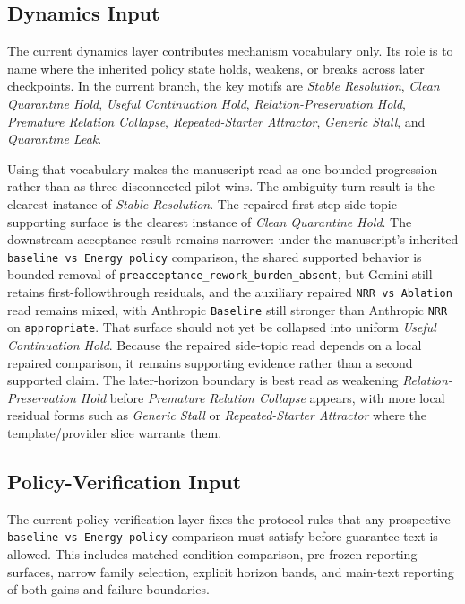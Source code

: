 \documentclass[11pt]{article}
\begin{document}
\subsection{Dynamics Input}

The current dynamics layer contributes mechanism vocabulary only. Its role is to
name where the inherited policy state holds, weakens, or breaks across later
checkpoints. In the current branch, the key motifs are \textit{Stable
Resolution}, \textit{Clean Quarantine Hold}, \textit{Useful Continuation Hold},
\textit{Relation-Preservation Hold}, \textit{Premature Relation Collapse},
\textit{Repeated-Starter Attractor}, \textit{Generic Stall}, and
\textit{Quarantine Leak}.

Using that vocabulary makes the manuscript read as one bounded progression rather
than as three disconnected pilot wins. The ambiguity-turn result is the clearest
instance of \textit{Stable Resolution}. The repaired first-step side-topic
supporting surface is the clearest instance of \textit{Clean Quarantine Hold}.
The downstream
acceptance result remains narrower: under the manuscript's inherited
\texttt{baseline vs Energy policy} comparison, the shared supported behavior is
bounded removal of \texttt{preacceptance\_rework\_burden\_absent}, but Gemini
still retains first-followthrough residuals, and the auxiliary repaired
\texttt{NRR vs Ablation} read remains mixed, with Anthropic \texttt{Baseline}
still stronger than Anthropic \texttt{NRR} on \texttt{appropriate}. That
surface should not yet be collapsed into uniform \textit{Useful Continuation
Hold}. Because the repaired side-topic read depends on a local repaired
comparison, it remains supporting evidence rather than a second supported
claim. The later-horizon boundary is best read as weakening
\textit{Relation-Preservation Hold} before \textit{Premature Relation Collapse}
appears, with more local residual forms such as \textit{Generic Stall} or
\textit{Repeated-Starter Attractor} where the template/provider slice warrants
them.

\subsection{Policy-Verification Input}

The current policy-verification layer fixes the protocol rules that any prospective
\texttt{baseline vs Energy policy} comparison must satisfy before guarantee text is
allowed. This includes matched-condition comparison, pre-frozen reporting
surfaces, narrow family selection, explicit horizon bands, and main-text
reporting of both gains and failure boundaries.
\end{document}

